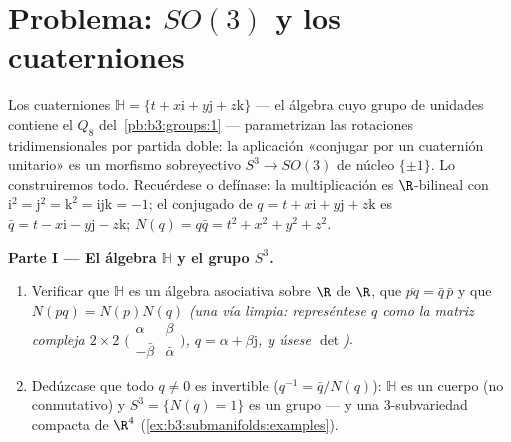 \section{Problema: \texorpdfstring{$SO(3)$}{SO(3)} y los
cuaterniones}

\begin{problem}\label{pb:b3:submanifolds:1} Los
cuaterniones $\mathbb H = \{t + x\mathrm i + y\mathrm j +
z\mathrm k\}$ --- el álgebra cuyo grupo de unidades contiene el $Q_8$
del~\cref{pb:b3:groups:1} --- parametrizan las rotaciones
tridimensionales por partida doble: la aplicación «conjugar por un
cuaternión unitario» es un morfismo sobreyectivo $S^3 \to
SO(3)$ de núcleo $\{\pm1\}$. Lo construiremos todo. Recuérdese o
defínase: la multiplicación es $\R$-bilineal con
$\mathrm i^2 = \mathrm j^2 = \mathrm k^2 =
\mathrm{ijk} = -1$; el conjugado de $q = t + x\mathrm i +
y\mathrm j + z\mathrm k$ es $\bar q = t - x\mathrm i -
y\mathrm j - z\mathrm k$; $N(q) = q\bar q = t^2 + x^2 + y^2
+ z^2$.

\medskip
\noindent\textbf{Parte I --- El álgebra $\mathbb H$ y el grupo $S^3$.}
\begin{enumerate}
  \item Verificar que $\mathbb H$ es un álgebra asociativa sobre $\R$ de
   $\R$, que $\overline{pq} =
        \bar q\,\bar p$ y que $N(pq) = N(p)N(q)$ \emph{(una vía limpia:
  represéntese $q$ como la matriz compleja $2\times2$
  $\bigl(\begin{smallmatrix}\alpha & \beta\\
        -\bar\beta & \bar\alpha\end{smallmatrix}\bigr)$, $q =
        \alpha + \beta\mathrm j$, y úsese $\det$)}. \item Dedúzcase que
  todo $q \neq 0$ es invertible ($q^{-1} =
        \bar q/N(q)$): $\mathbb H$ es un cuerpo (no conmutativo) y
  $S^3 = \{N(q) = 1\}$ es un grupo --- y una $3$-subvariedad
  compacta de $\R^4$
        (\cref{ex:b3:submanifolds:examples}).
\end{enumerate}


\end{problem}
